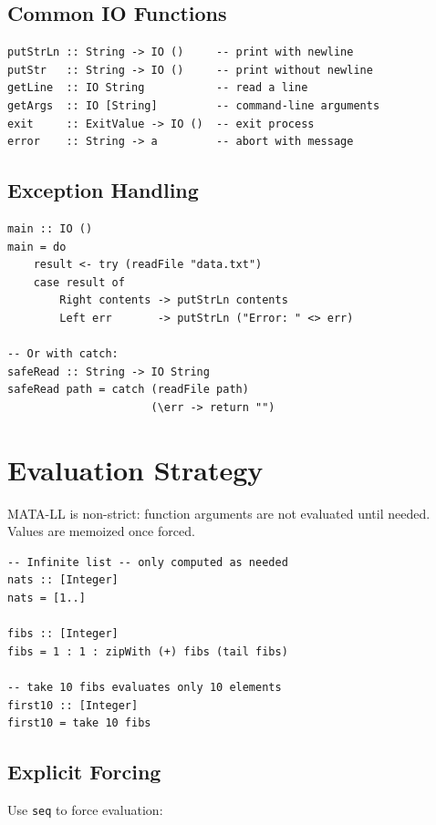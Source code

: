 \documentclass[11pt,a4paper]{article}
\begin{document}
\subsection{Common IO Functions}

\begin{lstlisting}
putStrLn :: String -> IO ()     -- print with newline
putStr   :: String -> IO ()     -- print without newline
getLine  :: IO String           -- read a line
getArgs  :: IO [String]         -- command-line arguments
exit     :: ExitValue -> IO ()  -- exit process
error    :: String -> a         -- abort with message
\end{lstlisting}

\subsection{Exception Handling}

\begin{lstlisting}
main :: IO ()
main = do
    result <- try (readFile "data.txt")
    case result of
        Right contents -> putStrLn contents
        Left err       -> putStrLn ("Error: " <> err)

-- Or with catch:
safeRead :: String -> IO String
safeRead path = catch (readFile path)
                      (\err -> return "")
\end{lstlisting}

\section{Evaluation Strategy}

MATA-LL is non-strict: function arguments are not evaluated until needed.
Values are memoized once forced.

\begin{lstlisting}
-- Infinite list -- only computed as needed
nats :: [Integer]
nats = [1..]

fibs :: [Integer]
fibs = 1 : 1 : zipWith (+) fibs (tail fibs)

-- take 10 fibs evaluates only 10 elements
first10 :: [Integer]
first10 = take 10 fibs
\end{lstlisting}

\subsection{Explicit Forcing}

Use \texttt{seq} to force evaluation:
\end{document}
